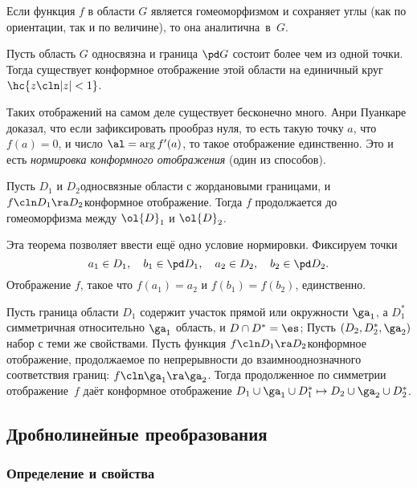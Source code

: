 \documentclass[a4paper]{article}
\begin{document}
\begin{theorem}[Д.\,Е.\,Меньшов, 1923\ч1926 г.]
Если функция $f$ в области $G$ является гомеоморфизмом и сохраняет углы (как по ориентации, так и по величине), то
она аналитична~в~$G$.
\end{theorem}

\begin{theorem}[Б.\,Риман]
Пусть область $G$ односвязна и граница $\pd G$ состоит более чем из одной точки. Тогда существует конформное
отображение этой области на единичный круг $\hc{z\cln |z|<1}$.
\end{theorem}

Таких отображений на самом деле существует бесконечно много. Анри Пуанкаре доказал, что если зафиксировать
прообраз нуля, то есть такую точку $a$, что $f(a)=0$, и число $\al = \arg f'(a)$, то такое отображение единственно.
Это и есть \emph{нормировка конформного отображения} (один из способов).

\begin{theorem}[Каратеодори]
Пусть $D_1$ и $D_2$\т односвязные области с жордановыми границами, и
$f\cln D_1\ra D_2$\т конформное отображение. Тогда $f$ продолжается до гомеоморфизма между $\ol{D}_1$ и $\ol{D}_2$.
\end{theorem}

Эта теорема позволяет ввести ещё одно условие нормировки. Фиксируем точки
$$a_1\in D_1, \quad b_1\in\pd D_1, \quad a_2\in D_2, \quad b_2\in \pd D_2.$$
Отображение $f$, такое что $f(a_1)=a_2$ и $f(b_1)=f(b_2)$, единственно.

\begin{theorem}
Пусть граница области $D_1$ содержит участок прямой или окружности $\ga_1$, а $D_1^*$\т
симметричная относительно $\ga_1$ область, и $D \cap D^*=\es$;
Пусть $(D_2, D_2^*,\ga_2)$\т набор с теми же свойствами. Пусть функция $f\cln D_1\ra D_2$\т конформное
отображение, продолжаемое по непрерывности до взаимно\д однозначного соответствия границ: $f\cln \ga_1 \ra \ga_2$.
Тогда продолженное по симметрии отображение~$f$ даёт конформное отображение
$D_1\cup\ga_1\cup D_1^* \mapsto D_2\cup\ga_2\cup D_2^*$.
\end{theorem}

\subsection{Дробно\д линейные преобразования}

\subsubsection{Определение и свойства}
\end{document}
